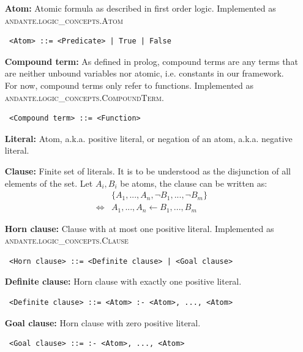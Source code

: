 \documentclass{article}
\begin{document}
\begin{itemize}
    \item[\textbf{Atom:}] Atomic formula as described in first order logic.
        Implemented as \textsc{andante.logic\_concepts.Atom} 
        \begin{verbatim} <Atom> ::= <Predicate> | True | False \end{verbatim}

    \item[\textbf{Compound term:}] As defined in prolog, compound terms are any
        terms that are neither unbound variables nor atomic, i.e. constants in
        our framework. For now, compound terms only refer to functions.
        Implemented as \textsc{andante.logic\_concepts.CompoundTerm}.
        \begin{verbatim} <Compound term> ::= <Function> \end{verbatim}

    \item[\textbf{Literal:}] Atom, a.k.a. positive literal, or negation of an
        atom, a.k.a. negative literal.

    \item[\textbf{Clause:}] Finite set of literals. It is to be understood as
        the disjunction of all elements of the set. Let $A_i, B_i$ be atoms,
        the clause can be written as:
    \begin{eqnarray*}
             & \{A_1, ..., A_n, \neg B_1, ..., \neg B_m\} \\
        \iff & A_1, ..., A_n \leftarrow B_1, ..., B_m
    \end{eqnarray*}

    \item[\textbf{Horn clause:}] Clause with at most one positive literal.
        Implemented as \textsc{andante.logic\_concepts.Clause} 
        \begin{verbatim} <Horn clause> ::= <Definite clause> | <Goal clause> \end{verbatim}

    \item[\textbf{Definite clause:}] Horn clause with exactly one positive
        literal. 
        \begin{verbatim} <Definite clause> ::= <Atom> :- <Atom>, ..., <Atom> \end{verbatim}

    \item[\textbf{Goal clause:}] Horn clause with zero positive literal. 
        \begin{verbatim} <Goal clause> ::= :- <Atom>, ..., <Atom> \end{verbatim}


\end{itemize}
\end{document}
